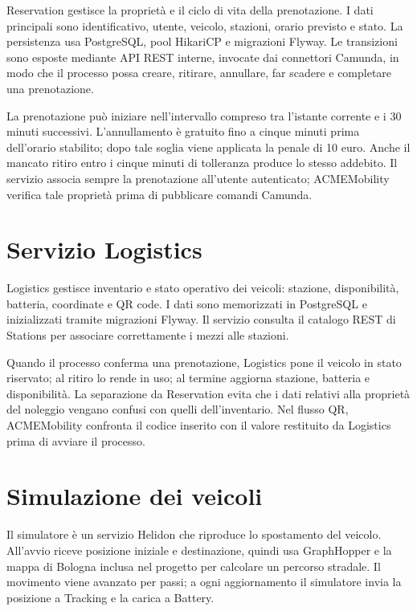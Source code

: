 \documentclass[12pt,a4paper,twoside]{report}
\begin{document}
Reservation gestisce la proprietà e il ciclo di vita della prenotazione. I
dati principali sono identificativo, utente, veicolo, stazioni, orario
previsto e stato. La persistenza usa PostgreSQL, pool HikariCP e migrazioni
Flyway. Le transizioni sono esposte mediante API REST interne, invocate dai
connettori Camunda, in modo che il processo possa creare, ritirare, annullare,
far scadere e completare una prenotazione.

La prenotazione può iniziare nell'intervallo compreso tra l'istante corrente e
i 30 minuti successivi. L'annullamento è gratuito fino a cinque minuti prima
dell'orario stabilito; dopo tale soglia viene applicata la penale di 10 euro.
Anche il mancato ritiro entro i cinque minuti di tolleranza produce lo stesso
addebito. Il servizio associa sempre la prenotazione all'utente autenticato;
ACMEMobility verifica tale proprietà prima di pubblicare comandi Camunda.

\section{Servizio Logistics}

Logistics gestisce inventario e stato operativo dei veicoli: stazione,
disponibilità, batteria, coordinate e QR code. I dati sono memorizzati in
PostgreSQL e inizializzati tramite migrazioni Flyway. Il servizio consulta il
catalogo REST di Stations per associare correttamente i mezzi alle stazioni.

Quando il processo conferma una prenotazione, Logistics pone il veicolo in
stato riservato; al ritiro lo rende in uso; al termine aggiorna stazione,
batteria e disponibilità. La separazione da Reservation evita che i dati relativi alla
proprietà del noleggio vengano confusi con quelli dell'inventario. Nel flusso
QR, ACMEMobility confronta il codice inserito con il valore restituito da
Logistics prima di avviare il processo.

\section{Simulazione dei veicoli}

Il simulatore è un servizio Helidon che riproduce lo spostamento del veicolo.
All'avvio riceve posizione iniziale e destinazione, quindi usa GraphHopper e
la mappa di Bologna inclusa nel progetto per calcolare un percorso stradale.
Il movimento viene avanzato per passi; a ogni aggiornamento il simulatore
invia la posizione a Tracking e la carica a Battery.
\end{document}
